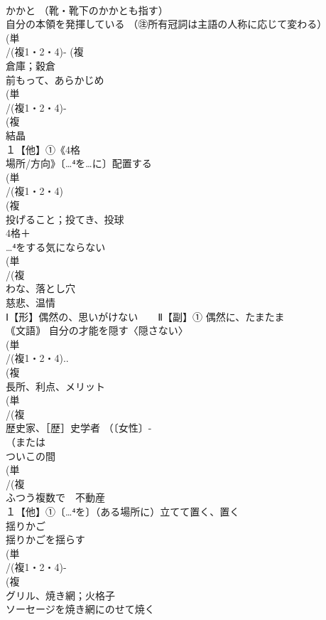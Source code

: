 \documentclass[8pt]{extreport}
\begin{document}
\begin{CJK}{UTF8}{min}
\\	かかと （靴・靴下のかかとも指す）
\\	自分の本領を発揮している （㊟所有冠詞は主語の人称に応じて変わる）
\\	(単
\\	/(複1・2・4)- (複
\\	倉庫；穀倉 
\\	前もって、あらかじめ
\\	(単
\\	/(複1・2・4)-
\\	(複
\\	結晶 
\\	１【他】①《4格
\\	場所/方向》〔…⁴を…に〕配置する
\\	(単
\\	/(複1・2・4)
\\	(複
\\	投げること；投てき、投球 
\\	4格＋
\\	…⁴をする気にならない
\\	(単
\\	/(複
\\	わな、落とし穴
\\	慈悲、温情
\\	Ⅰ【形】偶然の、思いがけない　　Ⅱ【副】① 偶然に、たまたま
\\	｟文語｠ 自分の才能を隠す〈隠さない〉
\\	(単
\\	/(複1・2・4)..
\\	(複
\\	長所、利点、メリット
\\	(単
\\	/(複
\\	歴史家、［歴］史学者 （〔女性〕-
\\	（または
\\	ついこの間
\\	(単
\\	/(複
\\	ふつう複数で　不動産 
\\	１【他】①〔…⁴を〕（ある場所に）立てて置く、置く
\\	揺りかご 
\\	揺りかごを揺らす 
\\	(単
\\	/(複1・2・4)-
\\	(複
\\	グリル、焼き網；火格子 
\\	ソーセージを焼き網にのせて焼く

\end{CJK}
\end{document}
